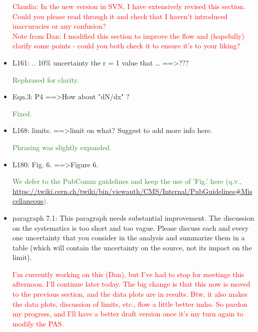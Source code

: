 \documentclass[paper=a4, fontsize=11pt]{scrartcl}
\begin{document}
\begin{itemize}
\textcolor{Red}{Claudia: In the new version in SVN, I have extensively revised this section.
Could you please read through it and check that I haven't introduced
inaccuracies or any confusion?\\
Note from Dan: I modified this section to improve the flow and (hopefully)
clarify some points - could you both check it to ensure it's to your liking?}\\

\item L161: 
.. 10\% uncertainty the r = 1 value that … ==\textgreater ??? 

\textcolor{ForestGreen}{Rephrased for clarity.}\\

\item Eqn.3: 
P4 ==\textgreater How about "dN/dx" ? 

\textcolor{ForestGreen}{Fixed.}\\

\item L168: 
limits. ==\textgreater limit on what? Suggest to add more info here. 

\textcolor{ForestGreen}{Phrasing was slightly expanded.}\\

\item L180:
Fig. 6. ==\textgreater Figure 6.

\textcolor{ForestGreen}{We defer to the PubComm guidelines and keep the use of 'Fig.' here
(q.v., \url{https://twiki.cern.ch/twiki/bin/viewauth/CMS/Internal/PubGuidelines\#Miscellaneous}).}\\


\item paragraph 7.1: 
This paragraph needs substantial improvement. The discussion on the 
systematics is too short and too vague. Please discuss each and every one 
uncertainty that you consider in the analysis and summarize them in a table 
(which will contain the uncertainty on the source, not its impact on the 
limit). 

\textcolor{Red}{I'm currently working on this (Dan), but I've had to stop
for meetings this afternoon. I'll continue later today. The big change is
that this now is moved to the previous section, and the data plots are in
results. Btw, it also makes the data plots, discussion of limits, etc.,
flow a little better imho. So pardon my progress, and I'll have a better
draft version once it's my turn again to modify the PAS.}\\



\end{itemize}
\end{document}
